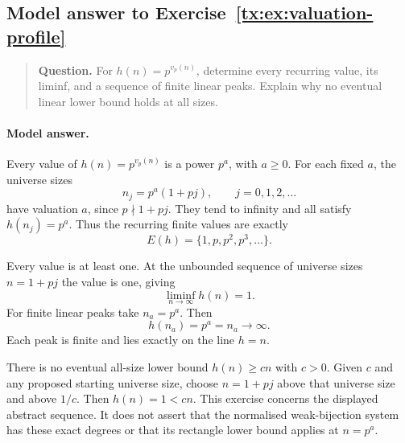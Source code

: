 \documentclass[11pt,a4paper,oneside,openany]{book}
\theoremstyle{definition}\newtheorem{definition}[theorem]{Definition}
\theoremstyle{remark}\newtheorem{remark}[theorem]{Remark}
\numberwithin{equation}{chapter}
\begin{document}
\begin{samepage}

\subsection*{Model answer to Exercise~\ref{tx:ex:valuation-profile}}\label{tx:ans:valuation-profile}

\begin{quote}\small\textbf{Question.} For $h(n)=p^{v_p(n)}$, determine every recurring value, its liminf,
and a sequence of finite linear peaks. Explain why no eventual linear
lower bound holds at all sizes.
\end{quote}

\paragraph{Model answer.}
Every value of \(h(n)=p^{v_p(n)}\) is a power \(p^a\), with \(a\ge0\).
For each fixed \(a\), the universe sizes
\[
                     n_j=p^a(1+pj),\qquad j=0,1,2,\ldots
\]
have valuation \(a\), since \(p\nmid1+pj\). They tend to infinity
and all satisfy \(h(n_j)=p^a\). Thus the recurring finite values
are exactly
\[
                         E(h)=\{1,p,p^2,p^3,\ldots\}.
\]
\end{samepage}

Every value is at least one. At the unbounded sequence of universe sizes
\(n=1+pj\) the value is one, giving
\[
                            \liminf_{n\to\infty}h(n)=1.
\]
For finite linear peaks take \(n_a=p^a\). Then
\[
                          h(n_a)=p^a=n_a\longrightarrow\infty.
\]
Each peak is finite and lies exactly on the line \(h=n\).

There is no eventual all-size lower bound \(h(n)\ge cn\) with \(c>0\).
Given \(c\) and any proposed starting universe size, choose \(n=1+pj\) above
that universe size and above \(1/c\). Then \(h(n)=1<cn\).
This exercise concerns the displayed abstract sequence. It does not
assert that the normalised weak-bijection system has these exact
degrees or that its rectangle lower bound applies at \(n=p^a\).


\par
\end{document}
